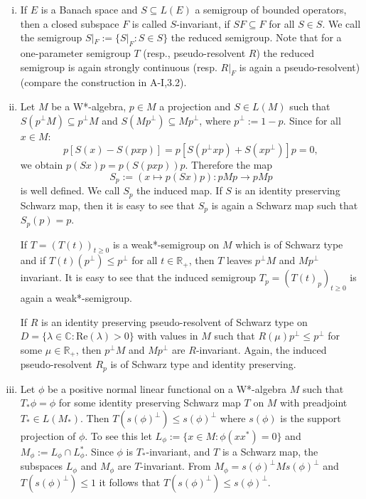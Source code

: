 \begin{enumerate}[(i)]
\item
If $ E $ is a Banach space and $ S \subseteq L(E) $ a semigroup of bounded operators, then a closed subspace $ F $ is called $ S $-invariant, if $ SF \subseteq F $ for all $ S \in S $.
We call the semigroup $ S|_F := \{S|_F : S \in S \} $ the reduced semigroup.
Note that for a one-parameter semigroup $ T $ (resp., pseudo-resolvent $ R $) the reduced semigroup is again strongly continuous (resp. $ R|_F $ is again a pseudo-resolvent) (compare the construction in A-I,3.2).

\item
Let $ M $ be a W*-algebra, $ p \in M $ a projection and $ S \in L(M) $ such that $ S(p^{\perp}M) \subseteq p^{\perp}M $ and $ S(Mp^{\perp}) \subseteq Mp^{\perp} $, where $ p^{\perp} := 1-p $.
Since for all $ x \in M $:
\[
p[S(x) - S(pxp)] = p[S(p^{\perp}xp) + S(xp^{\perp})]p = 0,
\]
we obtain $ p(Sx)p = p(S(pxp))p $.
Therefore the map
\[
S_p := (x \mapsto p(Sx)p) : pMp \to pMp
\]
is well defined.
We call $ S_p $ the induced map.
If $ S $ is an identity preserving Schwarz map, then it is easy to see that $ S_p $ is again a Schwarz map such that $ S_p(p) = p $.

If $ T = (T(t))_{t\geq0} $ is a weak*-semigroup on $ M $ which is of Schwarz type and if $ T(t)(p^{\perp}) \leq p^{\perp} $ for all $ t \in \mathbb{R}_+ $, then $ T $ leaves $ p^{\perp}M $ and $ Mp^{\perp} $ invariant.
It is easy to see that the induced semigroup $ T_p = (T(t)_p)_{t\geq0} $ is again a weak*-semigroup.

If $ R $ is an identity preserving pseudo-resolvent of Schwarz type on $ D = \{\lambda \in \mathbb{C} : \text{Re}(\lambda) > 0\} $ with values in $ M $ such that $ R(\mu)p^{\perp} \leq p^{\perp} $ for some $ \mu \in \mathbb{R}_+ $, then $ p^{\perp}M $ and $ Mp^{\perp} $ are $ R $-invariant.
Again, the induced pseudo-resolvent $ R_p $ is of Schwarz type and identity preserving.

\item
Let $ \phi $ be a positive normal linear functional on a W*-algebra $ M $ such that $ T_*\phi = \phi $ for some identity preserving Schwarz map $ T $ on $ M $ with preadjoint $ T_* \in L(M_*) $.
Then $ T(s(\phi)^{\perp}) \leq s(\phi)^{\perp} $ where $ s(\phi) $ is the support projection of $ \phi $.
To see this let $ L_{\phi} := \{x \in M: \phi(xx^*) = 0\} $ and $ M_{\phi} := L_{\phi} \cap L_{\phi}^* $.
Since $ \phi $ is $ T_* $-invariant, and $ T $ is a Schwarz map, the subspaces $ L_{\phi} $ and $ M_{\phi} $ are $ T $-invariant.
From $ M_{\phi} = s(\phi)^{\perp}Ms(\phi)^{\perp} $ and $ T(s(\phi)^{\perp}) \leq 1 $ it follows that $ T(s(\phi)^{\perp}) \leq s(\phi)^{\perp} $.

\end{enumerate}
%

